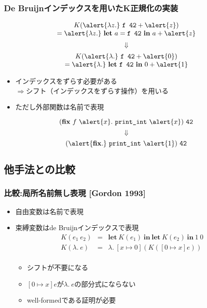 \documentclass[dvipdfmx,cjk,xcolor=dvipsnames,envcountsect,notheorems,12pt]{beamer}
\theoremstyle{definition}
\newcommand{\keyword}[1]{\mathbf{#1}}
\newcommand{\LET}{\keyword{let}}
\newcommand{\FIX}{\keyword{fix}}
\newcommand{\IN}{\keyword{in}}
\begin{document}
\begin{frame}[fragile]
	\frametitle{De Bruijnインデックスを用いたK正規化の実装}
	{\Large \[ \begin{array}{c}
		K(\alert{\lambda z.}~\texttt{f 42}+\alert{z})\\
		= \alert{\lambda z.}~\LET~a=\texttt{f 42}~\IN~a+\alert{z}
	\end{array}\]
	\[\Downarrow\]
	\[\begin{array}{c}
		K(\alert{\lambda.}~\texttt{f 42}+\alert{0})\\
		= \alert{\lambda.}~\LET~\texttt{f~42}~\IN~0+\alert{1}
	\end{array}\]}
	\vfill
	\LARGE 
	\begin{itemize}
		\item \alert{インデックスをずらす必要がある}\\
		{\large $\Rightarrow$シフト（インデックスをずらす操作）を用いる}
	\end{itemize}
\end{frame}

\begin{frame}
	\LARGE
	\begin{itemize}
		\item ただし外部関数は名前で表現
	\end{itemize}
	\vfill
	{\LARGE \[(\FIX~f~\alert{x}.~\texttt{print\_int}~\alert{x})~\texttt{42}\]
	\[\Downarrow\]
	\[(\alert{\FIX.}~\texttt{print\_int}~\alert{1})~\texttt{42}\]}
\end{frame}

\subsection{他手法との比較}

\begin{frame}
	\frametitle{比較:局所名前無し表現 [Gordon 1993]}
	\begin{itemize}
		\item 自由変数は名前で表現
		\item 束縛変数はde Bruijnインデックスで表現
			{\large \[\begin{array}{rcl}
				K(e_1~e_2) & = & \LET~ K(e_1)~\IN~\LET~K(e_2)~\IN~1~0 \\
				K(\lambda.~e) & = & \lambda.~[x\mapsto 0](K([0\mapsto x]e)) \\
			\end{array}\]}
			\begin{itemize}
				\item シフトが不要になる
				\item $[0\mapsto x]e$が$\lambda.~e$の部分式にならない
				\item well-formedである証明が必要
			\end{itemize}
	\end{itemize}
\end{frame}
\end{document}
